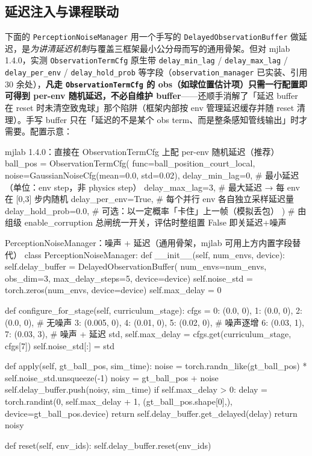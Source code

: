 \subsection{延迟注入与课程联动}

\begin{note}\label{note:rlmc-strike-mjlab-delay}
下面的 \verb|PerceptionNoiseManager| 用一个手写的 \verb|DelayedObservationBuffer| 做延迟，是\emph{为讲清延迟机制}与覆盖三框架最小公分母而写的通用骨架。但对 mjlab 1.4.0，实测 \verb|ObservationTermCfg| 原生带 \verb|delay_min_lag| / \verb|delay_max_lag| / \verb|delay_per_env| / \verb|delay_hold_prob| 等字段（\verb|observation_manager| 已实装、引用 30 余处），\textbf{凡走 \texttt{ObservationTermCfg} 的 obs（如球位置估计项）只需一行配置即可得到 per-env 随机延迟，不必自维护 buffer}——还顺手消解了「延迟 buffer 在 reset 时未清空致鬼球」那个陷阱（框架内部按 env 管理延迟缓存并随 reset 清理）。手写 buffer 只在「延迟的不是某个 obs term、而是整条感知管线输出」时才需要。配置示意：
\begin{codebox}[Python]{mjlab 1.4.0：直接在 ObservationTermCfg 上配 per-env 随机延迟（推荐）}
ball_pos = ObservationTermCfg(
    func=ball_position_court_local,
    noise=GaussianNoiseCfg(mean=0.0, std=0.02),
    delay_min_lag=0,          # 最小延迟（单位：env step，非 physics step）
    delay_max_lag=3,          # 最大延迟 → 每 env 在 [0,3] 步内随机
    delay_per_env=True,       # 每个并行 env 各自独立采样延迟量
    delay_hold_prob=0.0,      # 可选：以一定概率「卡住」上一帧（模拟丢包）
)   # 由组级 enable_corruption 总闸统一开关，评估时整组置 False 即关延迟+噪声
\end{codebox}
\end{note}

\begin{codebox}[Python]{PerceptionNoiseManager：噪声 + 延迟（通用骨架，mjlab 可用上方内置字段替代）}
class PerceptionNoiseManager:
    def __init__(self, num_envs, device):
        self.delay_buffer = DelayedObservationBuffer(
            num_envs=num_envs, obs_dim=3, max_delay_steps=5, device=device)
        self.noise_std = torch.zeros(num_envs, device=device)
        self.max_delay = 0

    def configure_for_stage(self, curriculum_stage):
        cfgs = {
            0: (0.0, 0), 1: (0.0, 0), 2: (0.0, 0),      # 无噪声
            3: (0.005, 0), 4: (0.01, 0), 5: (0.02, 0),  # 噪声逐增
            6: (0.03, 1), 7: (0.03, 3),                 # 噪声 + 延迟
        }
        std, self.max_delay = cfgs.get(curriculum_stage, cfgs[7])
        self.noise_std[:] = std

    def apply(self, gt_ball_pos, sim_time):
        noise = torch.randn_like(gt_ball_pos) * self.noise_std.unsqueeze(-1)
        noisy = gt_ball_pos + noise
        self.delay_buffer.push(noisy, sim_time)
        if self.max_delay > 0:
            delay = torch.randint(0, self.max_delay + 1,
                                  (gt_ball_pos.shape[0],), device=gt_ball_pos.device)
            return self.delay_buffer.get_delayed(delay)
        return noisy

    def reset(self, env_ids):
        self.delay_buffer.reset(env_ids)
\end{codebox}

